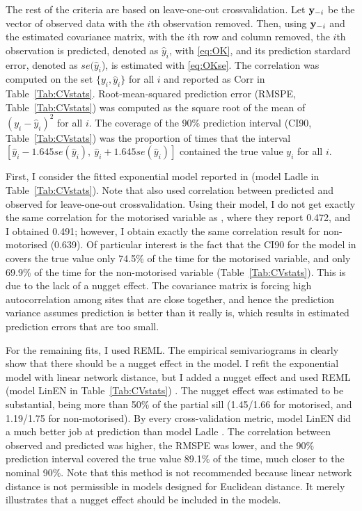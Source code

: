 \documentclass[11pt, titlepage]{article}\usepackage[]{graphicx}\usepackage[]{color}
\begin{document}
\begin{spacing}{1.9}
\begin{flushleft}
The rest of the criteria are based on leave-one-out crossvalidation.  Let $\mathbf{y}_{-i}$ be the vector of observed data with the $i$th observation removed. Then, using $\mathbf{y}_{-i}$ and the estimated covariance matrix, with the $i$th row and column removed, the $i$th observation is predicted, denoted as $\hat{y}_i$,  with \ref{eq:OK}, and its prediction stardard error, denoted as $se(\hat{y}_i$), is estimated with \ref{eq:OKse}. The correlation was computed on the set $\{y_i,\hat{y}_i\}$ for all $i$ and reported as Corr in Table~\ref{Tab:CVstats}.  Root-mean-squared prediction error (RMSPE, Table~\ref{Tab:CVstats}) was computed as the square root of the mean of $(y_i-\hat{y}_i)^2$ for all $i$. The coverage of the 90\% prediction interval (CI90, Table~\ref{Tab:CVstats}) was the proportion of times that the interval $[\hat{y}_i - 1.645 se(\hat{y}_i), \ \hat{y}_i + 1.645 se(\hat{y}_i)]$ contained the true value $y_i$ for all $i$.

First, I consider the fitted exponential model reported in \citet{Ladl:Avga:Whea:Boyc:pred:2016} (model Ladle in Table~\ref{Tab:CVstats}). Note that \citet{Ladl:Avga:Whea:Boyc:pred:2016} also used correlation between predicted and observed for leave-one-out crossvalidation. Using their model, I do not get exactly the same correlation for the motorised variable as \citet{Ladl:Avga:Whea:Boyc:pred:2016}, where they report 0.472, and I obtained 0.491; however, I obtain exactly the same correlation result for non-motorised (0.639).  Of particular interest is the fact that the CI90 for the model in \citet{Ladl:Avga:Whea:Boyc:pred:2016} covers the true value only 74.5\% of the time for the motorised variable, and only 69.9\% of the time for the non-motorised variable (Table~\ref{Tab:CVstats}). This is due to the lack of a nugget effect. The covariance matrix is forcing high autocorrelation among sites that are close together, and hence the prediction variance assumes prediction is better than it really is, which results in estimated prediction errors that are too small. 

For the remaining fits, I used REML. The empirical semivariograms in \citet{Ladl:Avga:Whea:Boyc:pred:2016} clearly show that there should be a nugget effect in the model. I refit the exponential model with linear network distance, but I added a nugget effect and used REML (model LinEN in Table~\ref{Tab:CVstats}) .  The nugget effect was estimated to be substantial, being more than 50\% of the partial sill (1.45/1.66 for motorised, and 1.19/1.75 for non-motorised). By every cross-validation metric, model LinEN did a much better job at prediction than model Ladle  \citep{Ladl:Avga:Whea:Boyc:pred:2016}.  The correlation between observed and predicted was higher, the RMSPE was lower, and the 90\% prediction interval covered the true value 89.1\% of the time, much closer to the nominal 90\%. Note that this method is not recommended because linear network distance is not permissible in models designed for Euclidean distance. It merely illustrates that a nugget effect should be included in the models.


\end{flushleft}
\end{spacing}
\end{document}
